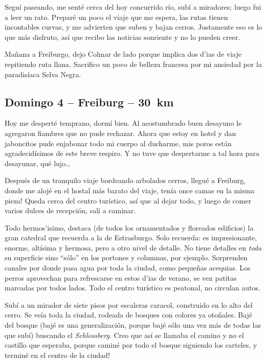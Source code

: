 Segu\'i paseando, me sent\'e cerca del hoy concurrido r\'io, sub\'i a miradores;
luego fui a leer un rato. Prepar\'e un poco el viaje que me espera, las rutas
tienen incontables curvas, y me advierten que suben y bajan cerros. Justamente
eso es lo que m\'as disfruto, as\'i que recibo las noticias sonriente y no lo
pueden creer.

Ma\~nana a Freiburgo, dejo Colmar de lado porque implica dos d'ias de viaje
repitiendo ruta llana. Sacrifico un poco de belleza francesa por mi ansiedad por
la paradis\'iaca Selva Negra.

\subsection*{Domingo 4 -- Freiburg -- 30~km}

Hoy me despert\'e temprano, dorm\'i bien. Al acostumbrado buen
desayuno le agregaron fiambres que no pude rechazar. Ahora que estoy en hotel
y dan jaboncitos pude enjabonar todo mi cuerpo al ducharme, mis poros
est\'an agradecid\'isimos de este breve respiro. Y no tuve que despertarme a
tal hora para desayunar, qu\'e lujo\ldots

Despu\'es de un tranquilo viaje bordeando arbolados cerros, llegu\'e a Freiburg,
donde me aloj\'e en el hostal m\'as barato del viaje, \textexclamdown ten\'ia
once camas en la misma pieza! Queda cerca del centro tur\'istico, as\'i que al
dejar todo, y luego de comer varios dulces de recepci\'on, sal\'i a caminar.

Todo hermos'isimo, destaca (de todos los ornamentados y floreados edificios)
la gran catedral que recuerda a la de Estrasburgo. Solo recuerda: es
impresionante, enorme, alt\'isima y hermosa, pero a otro nivel de detalle. No
tiene detalles en \emph{toda} su superficie sino ``s\'olo'' en los portones y
columnas, por ejemplo. Sorprenden canales por donde pasa agua por toda la
ciudad, como peque\~nas acequias. Los perros aprovechan para refrescarse en
estos d'ias de verano, se ven patitas marcadas por todos lados. Todo el centro
tur\'istico es peatonal, no circulan autos.

Sub\'i a un mirador de siete pisos por escaleras caracol, construido en lo
alto del cerro. Se ve\'ia toda la ciudad, rodeada de bosques con colores ya
oto\~nales. Baj\'e del bosque (baj\'e es una generalizaci\'on, porque baj\'e
s\'olo una vez m\'as de todas las que sub\'i) buscando el \emph{Schlossberg}.
Creo que as\'i se llamaba el camino y no el castillo que esperaba,
porque camin\'e por todo el bosque siguiendo los carteles, \textexclamdown y
termin\'e en el centro de la ciudad!

